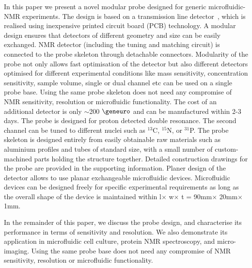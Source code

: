 \documentclass[preprint,12pt]{article}
\begin{document}
In this paper we present a novel modular probe designed for generic microfluidic-NMR experiments. The design is based on a transmission line detector~\cite{stripline_jan,gream_2016}, which is realised using inexpensive printed circuit board (PCB) technology. A modular design ensures that detectors of different geometry and size can be easily exchanged. NMR detector (including the tuning and matching circuit) is connected to the probe skeleton through detachable connectors. Modularity of the probe not only allows fast optimisation of the detector but also different detectors optimised for different experimental conditions like mass sensitivity, concentration sensitivity, sample volume, single or dual channel etc can be used on a single probe base. Using the same probe skeleton does not need any compromise of NMR sensitivity, resolution or microfluidic functionality. The cost of an additional detector is only $\sim$200 $\geneuro$ and can be manufactured within 2-3 days. The probe is designed for proton detected double resonance. The second channel can be tuned to different nuclei such as $^{13}$C, $^{15}$N, or $^{31}$P. The probe skeleton is designed entirely from easily obtainable raw materials such as aluminium profiles and tubes of standard size, with a small number of custom-machined parts holding the structure together. Detailed construction drawings for the probe are provided in the supporting information. Planer design of the detector allows to use planar exchangeable microfluidic devices. Microfluidic devices can be designed freely for specific experimental requirements as long as the overall shape of the device is maintained within l$\times$ w$\times$ t = 90mm$\times$ 20mm$\times$ 1mm.\par
In the remainder of this paper, we discuss the probe design, and characterise its performance in terms of sensitivity and resolution. We also demonstrate its application in microfluidic cell culture, protein NMR spectroscopy, and micro-imaging. Using the same probe base does not need any compromise of NMR sensitivity, resolution or microfluidic functionality.
\end{document}
